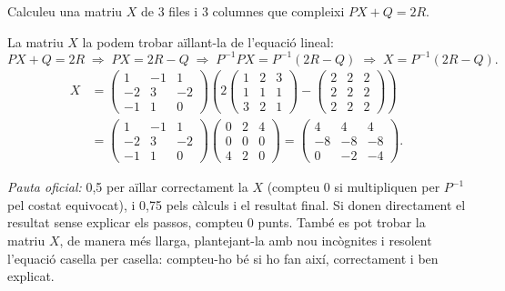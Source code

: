 \begin{apartats}
Calculeu una matriu $X$ de 3 files i 3 columnes que compleixi $PX+Q=2R$.

\begin{solucio}
La matriu $X$ la podem trobar aïllant-la de l'equació lineal:
\[
PX+Q=2R\;\Rightarrow\;PX=2R-Q\;\Rightarrow\;P^{-1}PX=P^{-1}(2R-Q)\;\Rightarrow\;X=P^{-1}(2R-Q).
\]
\begin{align*}
X&=\begin{pmatrix}1&-1&1\\-2&3&-2\\-1&1&0\end{pmatrix}
\left(2\begin{pmatrix}1&2&3\\1&1&1\\3&2&1\end{pmatrix}-\begin{pmatrix}2&2&2\\2&2&2\\2&2&2\end{pmatrix}\right)\\
&=\begin{pmatrix}1&-1&1\\-2&3&-2\\-1&1&0\end{pmatrix}\begin{pmatrix}0&2&4\\0&0&0\\4&2&0\end{pmatrix}
=\begin{pmatrix}4&4&4\\-8&-8&-8\\0&-2&-4\end{pmatrix}.
\end{align*}

\textit{Pauta oficial:} 0,5 per aïllar correctament la $X$ (compteu 0 si multipliquen per $P^{-1}$ pel costat
equivocat), i 0,75 pels càlculs i el resultat final. Si donen directament el resultat sense explicar els passos,
compteu 0 punts. També es pot trobar la matriu $X$, de manera més llarga, plantejant-la amb nou incògnites i
resolent l'equació casella per casella: compteu-ho bé si ho fan així, correctament i ben explicat.
\end{solucio}

\end{apartats}
